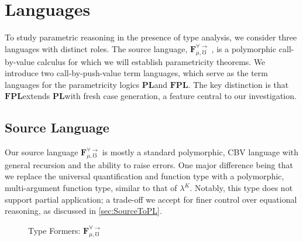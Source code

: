 \documentclass[acmsmall]{acmart}
\newcommand{\source}{$\mathbf{F}_{\mu,\mho}^{\forall\to}\;$}
\newcommand{\pl}{$\mathbf{PL}$}
\newcommand{\fpl}{$\mathbf{FPL}$}
\begin{document}
\section{Languages}\label{sec:Languages}
To study parametric reasoning in the presence of type analysis, we consider three languages with distinct roles. The source language, \source, is a polymorphic call-by-value calculus for which we will establish parametricity theorems. We introduce two call-by-push-value term languages, which serve as the term languages for the parametricity logics \pl\;and \fpl. The key distinction is that \fpl\;extends \pl\;with fresh case generation, a feature central to our investigation.

\subsection{Source Language}\label{sec:SourceLang}
Our source language \source is mostly a standard polymorphic, CBV language with general recursion and the ability to raise errors. One major difference being that we replace the universal quantification and function type with a polymorphic, multi-argument function type, similar to that of $\lambda^K$\cite{SysFtoTAL}. Notably, this type does not support partial application; a trade-off we accept for finer control over equational reasoning, as discussed in \cref{sec:SourceToPL}. 

\begin{figure}[!htbp]
  \caption{Type Formers: \source}
  \label{fig:value-type-formers}
\end{figure}
\end{document}
